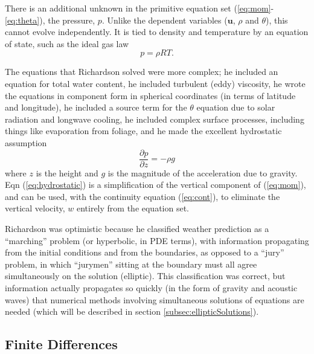 There is an additional unknown in the primitive equation set (\ref{eq:mom}-\ref{eq:theta}),
the pressure, $p$. Unlike the dependent variables ($\mathbf{u}$,
$\rho$ and $\theta$), this cannot evolve independently. It is tied
to density and temperature by an equation of state, such as the ideal
gas law
\begin{equation}
p=\rho RT.
\end{equation}

The equations that Richardson solved were more complex; he included
an equation for total water content, he included turbulent (eddy)
viscosity, he wrote the equations in component form in spherical coordinates
(in terms of latitude and longitude), he included a source term for
the $\theta$ equation due to solar radiation and longwave cooling,
he included complex surface processes, including things like evaporation
from foliage, and he made the excellent hydrostatic assumption
\begin{equation}
\frac{\partial p}{\partial z}=-\rho g\label{eq:hydrostatic}
\end{equation}
where $z$ is the height and $g$ is the magnitude of the acceleration
due to gravity. Eqn (\ref{eq:hydrostatic}) is a simplification of
the vertical component of (\ref{eq:mom}), and can be used, with the
continuity equation (\ref{eq:cont}), to eliminate the vertical velocity,
$w$ entirely from the equation set. 

Richardson was optimistic because he classified weather prediction
as a ``marching'' problem (or hyperbolic, in PDE terms), with information
propagating from the initial conditions and from the boundaries, as
opposed to a ``jury'' problem, in which ``jurymen'' sitting at
the boundary must all agree simultaneously on the solution (elliptic).
This classification was correct, but information actually propagates
so quickly (in the form of gravity and acoustic waves) that numerical
methods involving simultaneous solutions of equations are needed (which
will be described in section \ref{subsec:ellipticSolutions}).

\subsection{Finite Differences}

